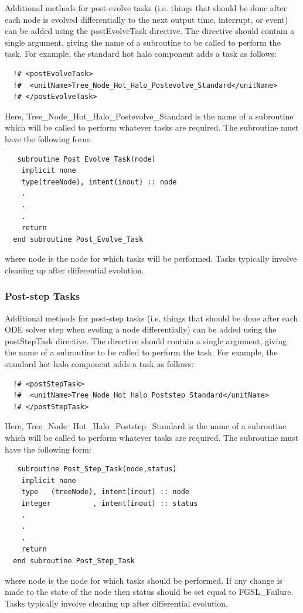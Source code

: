 Additional methods for post-evolve tasks (i.e. things that should be done after each node is evolved differentially to the next output time, interrupt, or event) can be added using the {\normalfont \ttfamily postEvolveTask} directive. The directive should contain a single argument, giving the name of a subroutine to be called to perform the task. For example, the standard hot halo component adds a task as follows:
\begin{verbatim}
  !# <postEvolveTask>
  !#  <unitName>Tree_Node_Hot_Halo_Postevolve_Standard</unitName>
  !# </postEvolveTask>
\end{verbatim}
Here, {\normalfont \ttfamily Tree\_Node\_Hot\_Halo\_Postevolve\_Standard} is the name of a subroutine which will be called to perform whatever tasks are required. The subroutine must have the following form:
\begin{verbatim}
   subroutine Post_Evolve_Task(node)
    implicit none
    type(treeNode), intent(inout) :: node
    .
    .
    .
    return
  end subroutine Post_Evolve_Task
\end{verbatim}
where {\normalfont \ttfamily node} is the node for which tasks will be performed. Tasks typically involve cleaning up after differential evolution.

\subsubsection{Post-step Tasks}

Additional methods for post-step tasks (i.e. things that should be done after each ODE solver step when evoling a node differentially) can be added using the {\normalfont \ttfamily postStepTask} directive. The directive should contain a single argument, giving the name of a subroutine to be called to perform the task. For example, the standard hot halo component adds a task as follows:
\begin{verbatim}
  !# <postStepTask>
  !#  <unitName>Tree_Node_Hot_Halo_Poststep_Standard</unitName>
  !# </postStepTask>
\end{verbatim}
Here, {\normalfont \ttfamily Tree\_Node\_Hot\_Halo\_Poststep\_Standard} is the name of a subroutine which will be called to perform whatever tasks are required. The subroutine must have the following form:
\begin{verbatim}
   subroutine Post_Step_Task(node,status)
    implicit none
    type   (treeNode), intent(inout) :: node
    integer          , intent(inout) :: status
    .
    .
    .
    return
  end subroutine Post_Step_Task
\end{verbatim}
where {\normalfont \ttfamily node} is the node for which tasks should be performed. If any change is made to the state of the node then {\normalfont \ttfamily status} should be set equal to {\normalfont \ttfamily FGSL\_Failure}. Tasks typically involve cleaning up after differential evolution.

